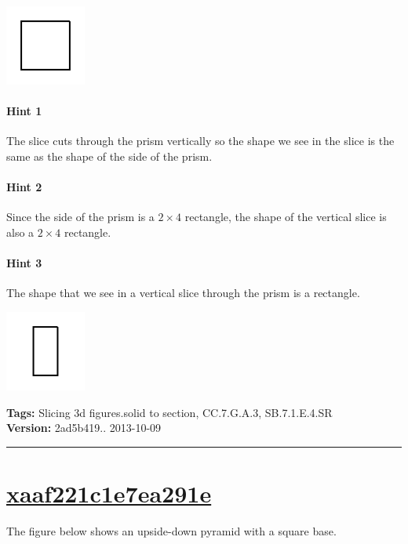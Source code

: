 \documentclass[twocolumn,10pt]{article}
\def\shrinkfactor{0.4}
\begin{document}
\includegraphics[scale=\shrinkfactor]{figures/4b59a0ece6acc7c19c389e1de534d1df93bf1169.png}



\paragraph{Hint 1}The slice cuts through the prism vertically so the shape we see in the slice is the same as the shape of the side of the prism.

\paragraph{Hint 2}Since the side of the prism is a $2 \times 4$ rectangle, the shape of the vertical slice is also a $2 \times 4$ rectangle.

\paragraph{Hint 3}The shape that we see in a vertical slice through the prism is a rectangle.   

\includegraphics[scale=\shrinkfactor]{figures/225bc3d058cebe2059fc56f78ef80b5f3e0f2da7.png}



\medskip
\noindent
\textbf{Tags:} {\footnotesize Slicing 3d figures.solid to section, CC.7.G.A.3, SB.7.1.E.4.SR}\\
\textbf{Version:} 2ad5b419.. 2013-10-09
\smallskip\hrule





\section{\href{https://www.khanacademy.org/devadmin/content/items/xaaf221c1e7ea291e}{xaaf221c1e7ea291e}}

\noindent
The figure below shows an upside-down pyramid with a square base.
\end{document}
